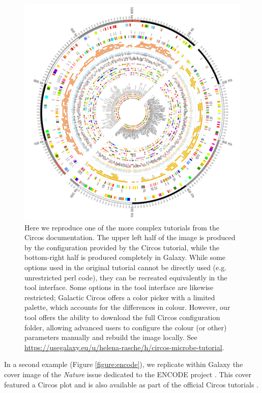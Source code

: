 \begin{figure}[h!]
\centering
\includegraphics[width=0.8\linewidth]{chapters/images/circos/plot-microbe-both.png}
	\caption{Here we reproduce one of the more complex tutorials from the Circos documentation. The upper left half of the image is produced by the configuration provided by the Circos tutorial, while the bottom-right half is produced completely in Galaxy. While some options used in the original tutorial cannot be directly used (e.g. unrestricted perl code), they can be recreated equivalently in the tool interface. Some options in the tool interface are likewise restricted; Galactic Circos offers a color picker with a limited palette, which accounts for the differences in colour. However, our tool offers the ability to download the full Circos configuration folder, allowing advanced users to configure the colour (or other) parameters manually and rebuild the image locally. See \url{https://usegalaxy.eu/u/helena-rasche/h/circos-microbe-tutorial}.}\label{figure:microbe}
\end{figure}

In a second example (Figure \ref{figure:encode}), we replicate within Galaxy the cover image of the \emph{Nature} issue \cite{nature-encode} dedicated to the ENCODE project \cite{encode2004encode}. This cover featured a Circos plot and is also available as part of the official Circos tutorials \cite{circos-nature-example}.

